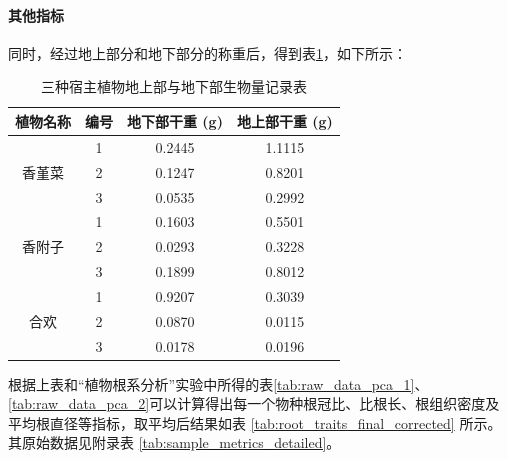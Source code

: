 \documentclass[10.5pt]{config}
\begin{document}
\paragraph{其他指标}

同时，经过地上部分和地下部分的称重后，得到表\ref{tab:raw_biomass}，如下所示：

\begin{table}[htbp]
    \centering
    \caption{三种宿主植物地上部与地下部生物量记录表}
    \label{tab:raw_biomass}
    \renewcommand{\arraystretch}{1.2} %
    \setlength{\tabcolsep}{10pt}      %
    \small                            %

    \begin{tabular}{cccc}
        \toprule
        \textbf{植物名称} & \textbf{编号} & \textbf{地下部干重 (g)} & \textbf{地上部干重 (g)} \\
        \midrule
        \multirow{3}{*}{香堇菜} & 1 & 0.2445 & 1.1115 \\
                                & 2 & 0.1247 & 0.8201 \\
                                & 3 & 0.0535 & 0.2992 \\
        \midrule
        \multirow{3}{*}{香附子} & 1 & 0.1603 & 0.5501 \\
                                & 2 & 0.0293 & 0.3228 \\
                                & 3 & 0.1899 & 0.8012 \\
        \midrule
        \multirow{3}{*}{合欢}   & 1 & 0.9207 & 0.3039 \\
                                & 2 & 0.0870 & 0.0115 \\
                                & 3 & 0.0178 & 0.0196 \\
        \bottomrule
    \end{tabular}
\end{table}

根据上表和“植物根系分析”实验中所得的表\ref{tab:raw_data_pca_1}、\ref{tab:raw_data_pca_2}可以计算得出每一个物种根冠比、比根长、根组织密度及平均根直径等指标，取平均后结果如表 \ref{tab:root_traits_final_corrected} 所示。其原始数据见附录表 \ref{tab:sample_metrics_detailed}。
\end{document}
